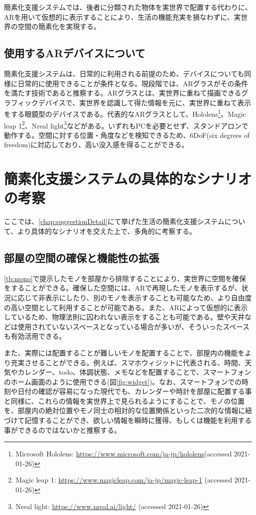 簡素化支援システムでは、後者に分類された物体を実世界で配置する代わりに、ARを用いて仮想的に表示することにより、生活の機能充実を損なわずに、実世界の空間の簡素化を実現する。

\subsection{使用するARデバイスについて}
\label{chap:ARdevice}

簡素化支援システムは、日常的に利用される前提のため、デバイスについても同様に日常的に使用できることが条件となる。現段階では、ARグラスがその条件を満たす技術であると推察する。ARグラスとは、実世界に重ねて描画できるグラフィックデバイスで、実世界を認識して得た情報を元に、実世界に重ねて表示をする眼鏡型のデバイスである。代表的なARグラスとして、Hololens\footnote{Microsoft Hololens: \url{https://www.microsoft.com/ja-jp/hololens}(accessed 2021-01-26)}、Magic leap 1\footnote{Magic leap 1: \url{https://www.magicleap.com/ja-jp/magic-leap-1} (accessed 2021-01-26)}、Nreal light\footnote{Nreal light: \url{https://www.nreal.ai/light/} (accessed 2021-01-26)}などがある。いずれもPCを必要とせず、スタンドアロンで動作する。空間に対する位置・角度などを検知できるため、6DoF(six degrees of freedom)に対応しており、高い没入感を得ることができる。

\newpage

\section{簡素化支援システムの具体的なシナリオの考察}

ここでは、\ref{chap:suggestionDetail}にて挙げた生活の簡素化支援システムについて、より具体的なシナリオを交えた上で、多角的に考察する。

\subsection{部屋の空間の確保と機能性の拡張}

\ref{tb:mono}で提示したモノを部屋から排除することにより、実世界に空間を確保をすることができる。確保した空間には、ARで再現したモノを表示するが、状況に応じて非表示にしたり、別のモノを表示することも可能なため、より自由度の高い空間として利用することが可能である。また、ARによって仮想的に表示しているため、物理法則に囚われない表示をすることも可能である。壁や天井などは使用されていないスペースとなっている場合が多いが、そういったスペースも有効活用できる。

また、実際には配置することが難しいモノを配置することで、部屋内の機能をより充実させることができる。例えば、スマホウィジットに代表される、時間、天気やカレンダー、todo、体調状態、メモなどを配置することで、スマートフォンのホーム画面のように使用できる(図\ref{fig:widget})。なお、スマートフォンでの時刻や日付の確認が容易になった現代でも、カレンダーや時計を部屋に配置する事と同様に、これらの情報を実世界上で見られるようにすることで、モノの位置を、部屋内の絶対位置やモノ同士の相対的な位置関係といった二次的な情報に紐づけて記憶することができ、欲しい情報を瞬時に獲得、もしくは機能を利用する事ができるのではないかと推察する。

